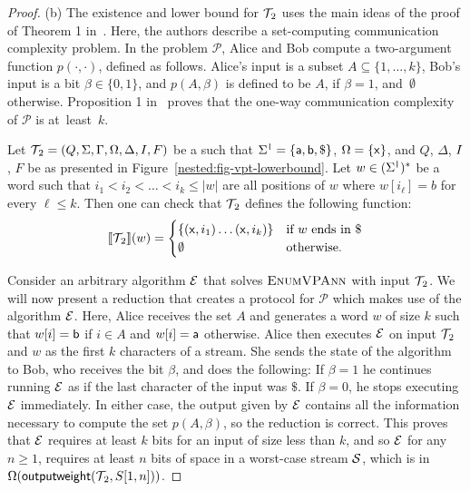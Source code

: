 \begin{proof}
	(b) The existence and lower bound for $\mathcal{T}\!_2$ uses the main ideas of the proof of Theorem 1 in~\cite{BarYossefFJ05}. Here, the authors describe a set-computing communication complexity problem. In the problem $\mathcal P$, Alice and Bob compute a two-argument function $p(\cdot, \cdot)$, defined as follows. Alice's input is a subset $A\subseteq\{1,\ldots,k\}$, Bob's input is a bit $\beta \in \{0,1\}$, and $p(A, \beta)$ is defined to be $A$, if $\beta = 1$, and~$\emptyset$ otherwise. Proposition 1 in~\cite{BarYossefFJ05} proves that the one-way communication complexity of $\mathcal P$ is at~least~$k$.
	
	Let $\mathcal{T}\!_2 = (Q, \Sigma, \Gamma, \Omega, \Delta, I, F)$ be a \vpann such that $\Sigma^{\texttt{|}} = \{{\sf a}, {\sf b}, \$\}$, $\Omega = \{{\sf x}\}$, and $Q$, $\Delta$, $I$, $F$ be as presented in Figure~\ref{nested:fig-vpt-lowerbound}. Let $w \in (\Sigma^{\texttt{|}})^*$ be a word such that $i_1 < i_2 < \ldots < i_k \leq |w|$  are all positions of $w$ where $w[i_\ell] = b$ for every $\ell \leq k$. Then one can check that $\mathcal{T}\!_2$ defines the following function:
	$$
	{\llbracket{\mathcal{T}\!_2}\rrbracket}(w) = \begin{cases}
		\{({\sf x}, i_1) \ldots ({\sf x}, i_k)\} & 
		\text{if } w \text{ ends in } \$\\
		\emptyset &\text{otherwise}.
	\end{cases}	
	$$	
	
	Consider an arbitrary algorithm $\mathcal{E}$ that solves $\textsc{EnumVPAnn}$ with input $\mathcal{T}\!_2$. We will now present a reduction that creates a protocol for ${\mathcal P}$ which makes use of the algorithm $\mathcal{E}$. Here, Alice receives the set $A$ and generates a word $w$ of size $k$ such that $w[i] = {\sf b}$ if $i\in A$ and $w[i] = {\sf a}$ otherwise. Alice then executes $\mathcal{E}$ on input $\mathcal{T}\!_2$ and $w$ as the first $k$ characters of a stream. She sends the state of the algorithm to Bob, who receives the bit $\beta$, and does the following: If $\beta = 1$ he continues running $\mathcal{E}$ as if the last character of the input was $\$$. If $\beta = 0$, he stops executing $\mathcal{E}$ immediately. In either case, the output given by $\mathcal{E}$ contains all the information necessary to compute the set $p(A,\beta)$, so the reduction is correct.  This proves that $\mathcal{E}$ requires at least $k$ bits for an input of size less than $k$, and so $\mathcal{E}$ for any $n \geq 1$, requires at least $n$ bits of space in a worst-case stream $\mathcal{S}$, which is in $\Omega(\mathsf{outputweight}(\mathcal{T}\!_2, S[1,n]))$.
\end{proof}
